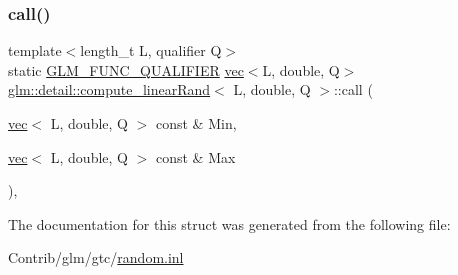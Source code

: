 \subsubsection{\texorpdfstring{call()}{call()}}
{\footnotesize\ttfamily template$<$length\+\_\+t L, qualifier Q$>$ \\
static \mbox{\hyperlink{setup_8hpp_a33fdea6f91c5f834105f7415e2a64407}{G\+L\+M\+\_\+\+F\+U\+N\+C\+\_\+\+Q\+U\+A\+L\+I\+F\+I\+ER}} \mbox{\hyperlink{structglm_1_1vec}{vec}}$<$L, double, Q$>$ \mbox{\hyperlink{structglm_1_1detail_1_1compute__linear_rand}{glm\+::detail\+::compute\+\_\+linear\+Rand}}$<$ L, double, Q $>$\+::call (\begin{DoxyParamCaption}\item[{\mbox{\hyperlink{structglm_1_1vec}{vec}}$<$ L, double, Q $>$ const \&}]{Min,  }\item[{\mbox{\hyperlink{structglm_1_1vec}{vec}}$<$ L, double, Q $>$ const \&}]{Max }\end{DoxyParamCaption})\hspace{0.3cm}{\ttfamily [inline]}, {\ttfamily [static]}}



The documentation for this struct was generated from the following file\+:\begin{DoxyCompactItemize}
\item 
Contrib/glm/gtc/\mbox{\hyperlink{random_8inl}{random.\+inl}}\end{DoxyCompactItemize}
